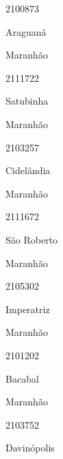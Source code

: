 \documentclass[
  letterpaper,
]{report}
\begin{document}
\n      

2100873

\n      

Araguanã

\n    

\n    

\n      

Maranhão

\n      

2111722

\n      

Satubinha

\n    

\n    

\n      

Maranhão

\n      

2103257

\n      

Cidelândia

\n    

\n    

\n      

Maranhão

\n      

2111672

\n      

São Roberto

\n    

\n    

\n      

Maranhão

\n      

2105302

\n      

Imperatriz

\n    

\n    

\n      

Maranhão

\n      

2101202

\n      

Bacabal

\n    

\n    

\n      

Maranhão

\n      

2103752

\n      

Davinópolis

\n    
\end{document}
